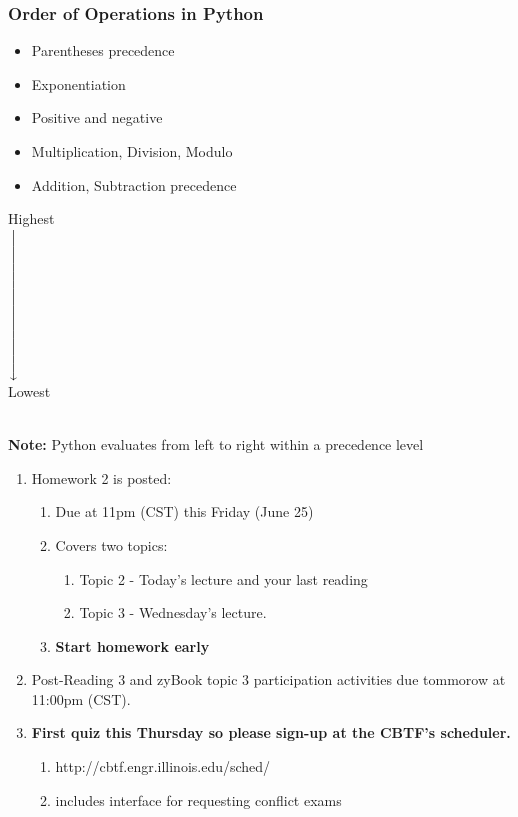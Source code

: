 \documentclass{beamer}
\newcommand{\xdownarrow}[1]{%
  {\left\downarrow\vbox to #1{}\right.\kern-\nulldelimiterspace}
}
\begin{document}
\begin{frame}
  \frametitle{Order of Operations in Python}
  \centering
  \begin{minipage}{0.49\textwidth}
    \begin{itemize}
      \item Parentheses precedence
      \item Exponentiation
      \item Positive and negative
      \item Multiplication, Division, Modulo
      \item Addition, Subtraction precedence
    \end{itemize}
  \end{minipage}
  \begin{minipage}{0.2\textwidth}
    \centering
    Highest\\
    $\xdownarrow{2cm}$\\
    Lowest\\
  \end{minipage}
  \vfill\\
  \textbf{Note:} Python evaluates from left to right within a precedence level
\end{frame}



%
%
%
\begin{frame}
  \begin{enumerate}
    \item Homework 2 is posted:
      \begin{enumerate}
        \item Due at 11pm (CST) this Friday (June 25)
        \item Covers two topics:
          \begin{enumerate}
            \item Topic 2 - Today's lecture and your last reading
            \item Topic 3 - Wednesday's lecture. 
          \end{enumerate}
        \item \textbf{Start homework early}
      \end{enumerate}
    \item Post-Reading 3 and zyBook topic 3 participation activities due tommorow at 11:00pm (CST).
    \item \textbf{First quiz this Thursday so please sign-up at the CBTF's scheduler.}
      \begin{enumerate}
        \item http://cbtf.engr.illinois.edu/sched/
        \item includes interface for requesting conflict exams
      \end{enumerate}
  \end{enumerate}
\end{frame}
\end{document}
